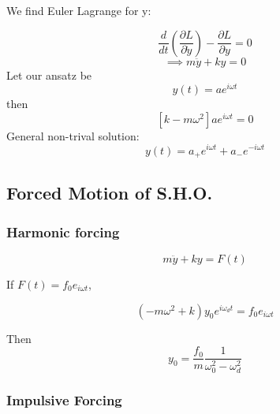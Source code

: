 \documentclass{article}
\newtheorem{one minute paper}[theorem]{One Minute Paper}
\begin{document}
We find Euler Lagrange for y:

\begin{equation}
    \frac{d}{dt}(\frac{\partial L}{\partial \dot{y}}) - \frac{\partial L}{\partial y} = 0
\end{equation}
\begin{equation}
    \implies m\ddot{y} + ky = 0
\end{equation}
Let our ansatz be 
\begin{equation}
    y(t) = ae^{i\omega t}
\end{equation}
then
\begin{equation}
    \left[k - m\omega^2\right]ae^{i\omega t} = 0
\end{equation}
General non-trival solution:
\begin{equation}
    y(t) = a_{+}e^{i\omega t} + a_{-}e^{-i\omega t}
\end{equation}

\subsection*{Forced Motion of S.H.O.}

\subsubsection*{Harmonic forcing}

\begin{equation}
    m\ddot{y} + ky = F(t)
\end{equation}

If $F(t) = f_0e_{i\omega t}$, 

\begin{equation}
    (-m\omega^2 + k)y_0e^{i\omega_d t} = f_0e_{i\omega t} 
\end{equation}

Then 
\begin{equation}
    y_0 = \frac{f_0}{m}\frac{1}{\omega_0^2 - \omega_d^2}
\end{equation}

\subsubsection*{Impulsive Forcing}
\end{document}
